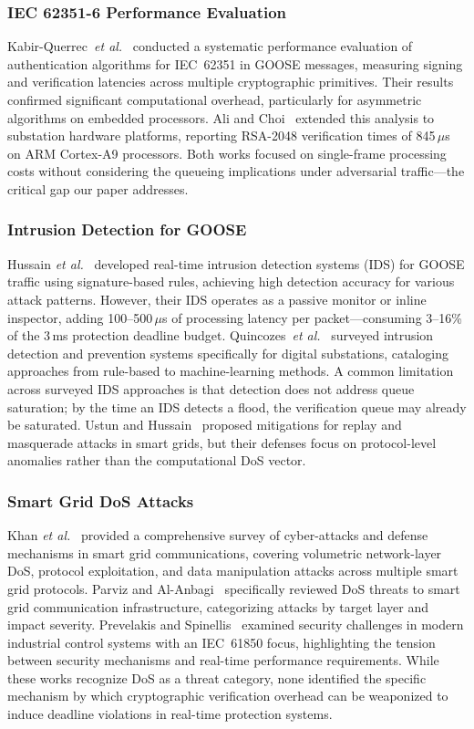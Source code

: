\documentclass{ieeeaccess}
\begin{document}
\subsubsection{IEC 62351-6 Performance Evaluation}
Kabir-Querrec~\textit{et al.}~\cite{kabir2020goose} conducted a systematic performance evaluation of authentication algorithms for IEC~62351 in GOOSE messages, measuring signing and verification latencies across multiple cryptographic primitives. Their results confirmed significant computational overhead, particularly for asymmetric algorithms on embedded processors. Ali and Choi~\cite{ali2020latency} extended this analysis to substation hardware platforms, reporting RSA-2048 verification times of 845\,$\mu$s on ARM Cortex-A9 processors. Both works focused on single-frame processing costs without considering the queueing implications under adversarial traffic---the critical gap our paper addresses.

\subsubsection{Intrusion Detection for GOOSE}
Hussain \textit{et al.}~\cite{hussain2019goose} developed real-time intrusion detection systems (IDS) for GOOSE traffic using signature-based rules, achieving high detection accuracy for various attack patterns. However, their IDS operates as a passive monitor or inline inspector, adding 100--500\,$\mu$s of processing latency per packet---consuming 3--16\% of the 3\,ms protection deadline budget. Quincozes~\textit{et al.}~\cite{quincozes2021survey} surveyed intrusion detection and prevention systems specifically for digital substations, cataloging approaches from rule-based to machine-learning methods. A common limitation across surveyed IDS approaches is that detection does not address queue saturation; by the time an IDS detects a flood, the verification queue may already be saturated. Ustun and Hussain~\cite{ustun2019novel} proposed mitigations for replay and masquerade attacks in smart grids, but their defenses focus on protocol-level anomalies rather than the computational DoS vector.

\subsubsection{Smart Grid DoS Attacks}
Khan \textit{et al.}~\cite{khan2021survey} provided a comprehensive survey of cyber-attacks and defense mechanisms in smart grid communications, covering volumetric network-layer DoS, protocol exploitation, and data manipulation attacks across multiple smart grid protocols. Parviz and Al-Anbagi~\cite{parviz2022dos} specifically reviewed DoS threats to smart grid communication infrastructure, categorizing attacks by target layer and impact severity. Prevelakis and Spinellis~\cite{prevelakis2018ics} examined security challenges in modern industrial control systems with an IEC~61850 focus, highlighting the tension between security mechanisms and real-time performance requirements. While these works recognize DoS as a threat category, none identified the specific mechanism by which cryptographic verification overhead can be weaponized to induce deadline violations in real-time protection systems.
\end{document}
